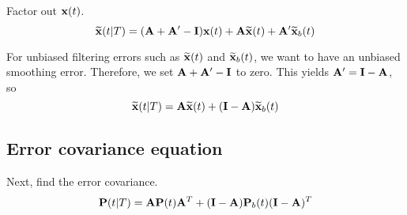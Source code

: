 Factor out $\mathbf{x}(t)$.
\begin{equation*}
  \widetilde{\mathbf{x}}(t|T) = (\mathbf{A} + \mathbf{A}' - \mathbf{I})\mathbf{x}(t) +
    \mathbf{A}\widetilde{\mathbf{x}}(t) + \mathbf{A}'\widetilde{\mathbf{x}}_b(t)
\end{equation*}

For unbiased filtering errors such as $\widetilde{\mathbf{x}}(t)$ and
$\widetilde{\mathbf{x}}_b(t)$, we want to have an unbiased smoothing error.
Therefore, we set $\mathbf{A} + \mathbf{A}' - \mathbf{I}$ to zero. This yields
$\mathbf{A}' = \mathbf{I} - \mathbf{A}$, so
\begin{equation*}
  \widetilde{\mathbf{x}}(t|T) = \mathbf{A}\widetilde{\mathbf{x}}(t) +
    (\mathbf{I} - \mathbf{A})\widetilde{\mathbf{x}}_b(t)
\end{equation*}

\subsection{Error covariance equation}

Next, find the error covariance.
\begin{equation}
  \mathbf{P}(t|T) = \mathbf{A}\mathbf{P}(t)\mathbf{A}^T +
    (\mathbf{I} - \mathbf{A})\mathbf{P}_b(t)(\mathbf{I} - \mathbf{A})^T
    \label{eq:ks_error_cov_a}
\end{equation}

